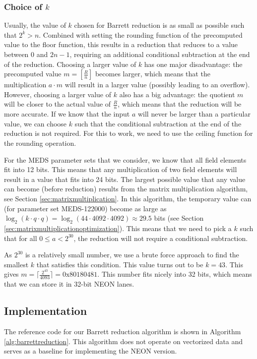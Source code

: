 \documentclass[11pt,a4paper]{report}
\theoremstyle{definition}
\begin{document}
\subsubsection{Choice of $k$}
Usually, the value of $k$ chosen for Barrett reduction is as small as possible such that $2^k > n$. Combined with setting the rounding function of the precomputed value to the floor function, this results in a reduction that reduces to a value between $0$ and $2n-1$, requiring an additional conditional subtraction at the end of the reduction. Choosing a larger value of $k$ has one major disadvantage: the precomputed value $m = \left[\frac{R}{n}\right]$ becomes larger, which means that the multiplication $a \cdot m$ will result in a larger value (possibly leading to an overflow). However, choosing a larger value of $k$ also has a big advantage: the quotient $m$ will be closer to the actual value of $\frac{R}{n}$, which means that the reduction will be more accurate. If we know that the input $a$ will never be larger than a particular value, we can choose $k$ such that the conditional subtraction at the end of the reduction is not required. For this to work, we need to use the ceiling function for the rounding operation.

For the MEDS parameter sets that we consider, we know that all field elements fit into 12 bits. This means that any multiplication of two field elements will result in a value that fits into 24 bits. The largest possible value that any value can become (before reduction) results from the matrix multiplication algorithm, see Section \ref{sec:matrixmultiplication}. In this algorithm, the temporary value can (for parameter set MEDS-122000) become as large as $\log_2(k \cdot q \cdot q) = \log_2(44 \cdot 4092 \cdot 4092) \approx 29.5$ bits (see Section \ref{sec:matrixmultiplicationoptimization}). This means that we need to pick a $k$ such that for all $0 \leq a < 2^{30}$, the reduction will not require a conditional subtraction.

As $2^{30}$ is a relatively small number, we use a brute force approach to find the smallest $k$ that satisfies this condition. This value turns out to be $k = 43$. This gives $m = \lceil \frac{2^{43}}{4093} \rceil = 0\text{x}80180481$. This number fits nicely into 32 bits, which means that we can store it in 32-bit NEON lanes.

\subsection{Implementation}
The reference code for our Barrett reduction algorithm is shown in Algorithm \ref{alg:barrettreduction}. This algorithm does not operate on vectorized data and serves as a baseline for implementing the NEON version.
\end{document}
